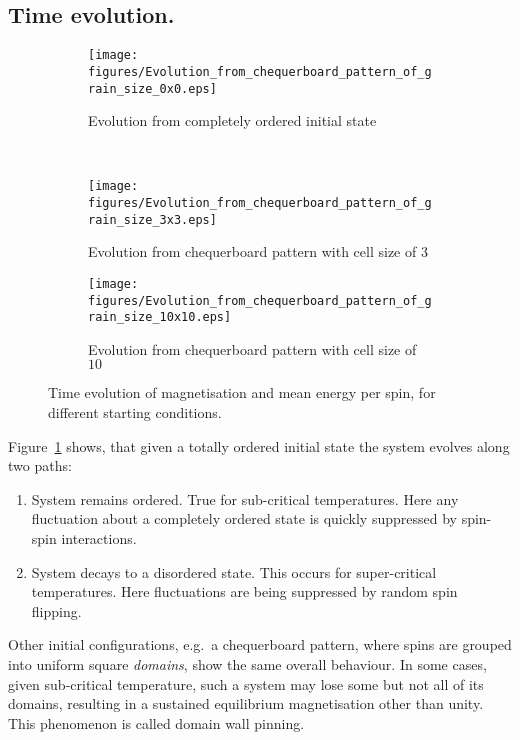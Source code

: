 \documentclass[12pt]{article}
\begin{document}
\subsection{Time evolution. }

\begin{figure}[p]
  \begin{subfigure}[b] {0.49\textwidth}
    \texttt{[image: figures/Evolution\_from\_chequerboard\_pattern\_of\_grain\_size\_0x0.eps]}
    \caption{Evolution from completely ordered initial state}
  \end{subfigure}\ 
  \begin{subfigure}[b] {0.49\textwidth}
    \texttt{[image: figures/Evolution\_from\_chequerboard\_pattern\_of\_grain\_size\_3x3.eps]}
    \caption{Evolution from chequerboard pattern with cell size of \(3\)}
  \end{subfigure}\newline
  \begin{subfigure}[b] {0.49\textwidth}
    \texttt{[image: figures/Evolution\_from\_chequerboard\_pattern\_of\_grain\_size\_10x10.eps]}
    \caption{Evolution from chequerboard pattern with cell size of \(10\)}
  \end{subfigure}\newline
  \caption[Time evolution]{Time evolution of magnetisation and mean energy per spin, for different starting conditions. }\label{fig:time_evolution}
\end{figure}

Figure~\ref{fig:time_evolution} shows, that given a totally ordered initial state the system evolves along two paths:

\begin{enumerate}
\item System remains ordered. True for sub-critical temperatures. Here any fluctuation about a completely ordered state is quickly suppressed by spin-spin interactions.
\item System decays to a disordered state. This occurs for super-critical temperatures. Here fluctuations are being suppressed by random spin flipping. 
\end{enumerate}

Other initial configurations, e.g.~a chequerboard pattern,  where spins are grouped into uniform square \emph{domains}, show the same overall behaviour. In some cases, given sub-critical temperature, such a system may lose some but not all of its domains, resulting in a sustained equilibrium magnetisation other than unity. This phenomenon is called domain wall pinning.
\end{document}
